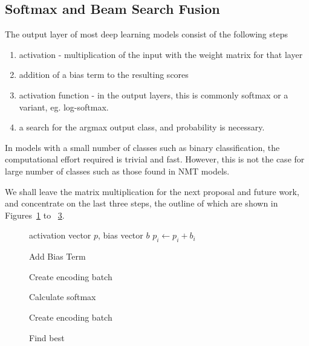 \documentclass[]{article}
\begin{document}
\subsection{Softmax and Beam Search Fusion}

The output layer of most deep learning models consist of the following steps
\begin{enumerate}
   \item \vspace{-2 mm} activation - multiplication of the input with the weight matrix for that layer
   \item \vspace{-2 mm} addition of a bias term to the resulting scores
   \item \vspace{-2 mm} activation function - in the output layers, this is commonly softmax or a variant, eg. log-softmax.
   \item \vspace{-2 mm} a search for the argmax output class, and probability is necessary.
\end{enumerate}

In models with a small number of classes such as binary classification, the computational effort required is trivial and fast. However, this is not the case for large number of classes such as those found in NMT models.

We shall leave the matrix multiplication for the next proposal and future work, and concentrate on the last three steps, the outline of which are shown in Figures~\ref{algo:Add Bias Term} to ~\ref{algo:Find best}.

\begin{figure} [h]
\begin{algorithmic}
\REQUIRE activation vector $p$, bias vector $b$
  \STATE $p_i \gets p_i + b_i$
\ENDFOR 
\end{algorithmic}
\caption{Add Bias Term}
\label{algo:Add Bias Term}
\end{figure}

\begin{figure} [h]
\begin{algorithmic}
  \STATE Create encoding batch
\ENDWHILE 
\end{algorithmic}
\caption{Calculate softmax}
\label{algo:Calculate softmax}
\end{figure}

\begin{figure} [h]
\begin{algorithmic}
  \STATE Create encoding batch
\ENDWHILE 
\end{algorithmic}
\caption{Find best}
\label{algo:Find best}
\end{figure}
\end{document}
